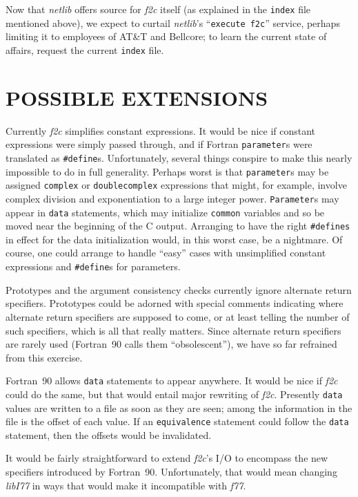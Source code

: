 \documentclass[10pt,a4paper]{article}
\begin{document}
Now that \emph{netlib} offers source for \emph{f2c} itself (as explained in the \verb|index| file mentioned above), we expect to curtail \emph{netlib}’s ``\texttt{execute f2c}'' service, perhaps limiting it to employees of AT\&T and Bellcore; to learn the current state of affairs, request the current \verb|index| file.

\section{POSSIBLE EXTENSIONS} \label{sec:possible-extensions}

Currently \emph{f2c} simplifies constant expressions. It would be nice if constant expressions were simply passed through, and if Fortran \verb|parameter|s were translated as \verb|#define|s. Unfortunately, several things conspire to make this nearly impossible to do in full generality. Perhaps worst is that \verb|parameter|s may be assigned \verb|complex| or \verb|doublecomplex| expressions that might, for example, involve complex division and exponentiation to a large integer power. \verb|Parameter|s may appear in \verb|data| statements, which may initialize \verb|common| variables and so be moved near the beginning of the C output. Arranging to have the right \verb|#defines| in effect for the data initialization would, in this worst case, be a nightmare. Of course, one could arrange to handle ``easy'' cases with unsimplified constant expressions and \verb|#define|s for parameters.

Prototypes and the argument consistency checks currently ignore alternate return specifiers. Prototypes could be adorned with special comments indicating where alternate return specifiers are supposed to come, or at least telling the number of such specifiers, which is all that really matters. Since alternate return specifiers are rarely used (Fortran~90 calls them ``obsolescent''), we have so far refrained from this exercise.

Fortran~90 allows \verb|data| statements to appear anywhere. It would be nice if \emph{f2c} could do the same, but that would entail major rewriting of \emph{f2c}. Presently \verb|data| values are written to a file as soon as they are seen; among the information in the file is the offset of each value. If an \verb|equivalence| statement could follow the \verb|data| statement, then the offsets would be invalidated.

It would be fairly straightforward to extend \emph{f2c}’s I/O to encompass the new specifiers introduced by Fortran~90. Unfortunately, that would mean changing \emph{libI77} in ways that would make it incompatible with \emph{f77}.
\end{document}
